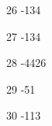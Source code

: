 \begin{loigiaibt}{26}
 -134
\end{loigiaibt}
\begin{loigiaibt}{27}
 -134
\end{loigiaibt}
\begin{loigiaibt}{28}
 -4426
\end{loigiaibt}
\begin{loigiaibt}{29}
 -51
\end{loigiaibt}
\begin{loigiaibt}{30}
 -113
\end{loigiaibt}
